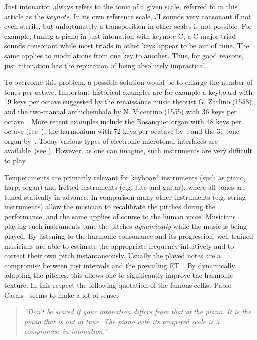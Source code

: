Just intonation always refers to the tonic of a given scale, referred to in this article as the \textit{keynote}. In its own reference scale, JI sounds very consonant if not even sterile, but unfortunately a transposition in other scales is not possible. For example, tuning a piano in just intonation with keynote C,  a C-major triad sounds consonant while most triads in other keys appear to be out of tune. The same applies to modulations from one key to another. Thus, for good reasons, just intonation has the reputation of being absolutely impractical.

To overcome this problem, a possible solution would be to enlarge the number of tones per octave. Important historical examples are for example a keyboard with 19 keys per octave suggested by the renaissance music theorist G. Zarlino (1558), and the two-manual archichembalo by N. Vicentino (1555) with 36 keys per octave~\cite{Vicentino}. More recent examples include the Bosanquet organ with 48 keys per octave (see~\cite{helmholtz}), the harmonium with 72 keys per ocatave by~\cite{Oettingen}, and the 31-tone organ by~\cite{fokker}. Today various types of electronic microtonal interfaces are available~(see \cite{Douglas,macritchie}). However, as one can imagine, such instruments are very difficult to play.

\vspace{2mm}
Temperaments are primarily relevant for keyboard instruments (such as piano, harp, organ) and fretted instruments (e.g. lute and guitar), where all tones are tuned statically in advance. In comparison many other instruments (e.g. string instruments) allow the musician to recalibrate the pitches during the performance, and the same applies of course to the human voice. Musicians playing such instruments tune the pitches \textit{dynamically} while the music is being played. By listening to the harmonic consonance and its progression, well-trained musicians are able to estimate the appropriate frequency intuitively and to correct their own pitch instantaneously. Usually the played notes are a compromise between just intervals and the prevailing ET~\cite{DuffinArticle}. By dynamically adapting the pitches, this allows one to significantly improve the harmonic texture. In this respect the following quotation of the famous cellist Pablo Casals~\cite{Casals} seems to make a lot of sense: 
\begin{quote}
\textit{``Don’t be scared if your intonation differs from that of the piano. It is the piano that  is out of tune.  The piano with its tempered scale is a compromise in intonation.''} 
\end{quote}
\vspace{2mm}

